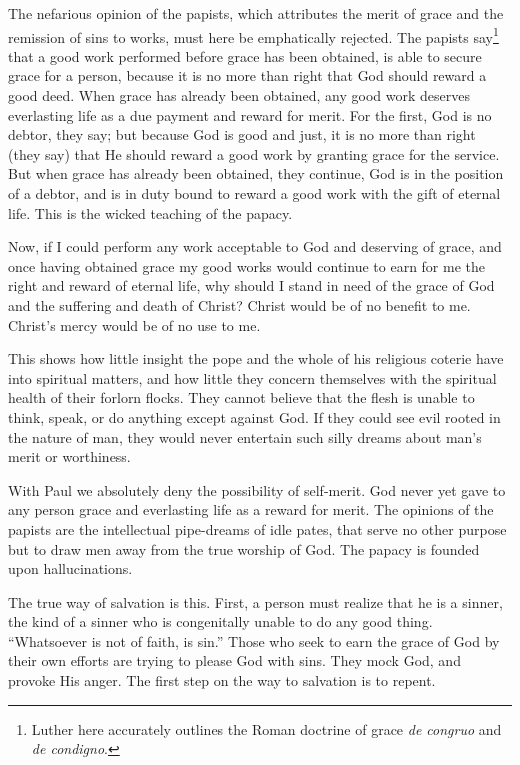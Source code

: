 The nefarious opinion of the papists, which attributes the merit of grace and the remission of sins to works, must here be emphatically rejected. The papists say\footnote{Luther here accurately outlines the Roman doctrine of grace \emph{de congruo} and \emph{de condigno}.} that a good work performed before grace has been obtained, is able to secure grace for a person, because it is no more than right that God should reward a good deed. When grace has already been obtained, any good work deserves everlasting life as a due payment and reward for merit. For the first, God is no debtor, they say; but because God is good and just, it is no more than right (they say) that He should reward a good work by granting grace for the service. But when grace has already been obtained, they continue, God is in the position of a debtor, and is in duty bound to reward a good work with the gift of eternal life. This is the wicked teaching of the papacy.

Now, if I could perform any work acceptable to God and deserving of grace, and once having obtained grace my good works would continue to earn for me the right and reward of eternal life, why should I stand in need of the grace of God and the suffering and death of Christ? Christ would be of no benefit to me. Christ’s mercy would be of no use to me.

This shows how little insight the pope and the whole of his religious coterie have into spiritual matters, and how little they concern themselves with the spiritual health of their forlorn flocks. They cannot believe that the flesh is unable to think, speak, or do anything except against God. If they could see evil rooted in the nature of man, they would never entertain such silly dreams about man’s merit or worthiness.

With Paul we absolutely deny the possibility of self-merit. God never yet gave to any person grace and everlasting life as a reward for merit. The opinions of the papists are the intellectual pipe-dreams of idle pates, that serve no other purpose but to draw men away from the true worship of God. The papacy is founded upon hallucinations.

The true way of salvation is this. First, a person must realize that he is a sinner, the kind of a sinner who is congenitally unable to do any good thing. “Whatsoever is not of faith, is sin.” Those who seek to earn the grace of God by their own efforts are trying to please God with sins. They mock God, and provoke His anger. The first step on the way to salvation is to repent.

